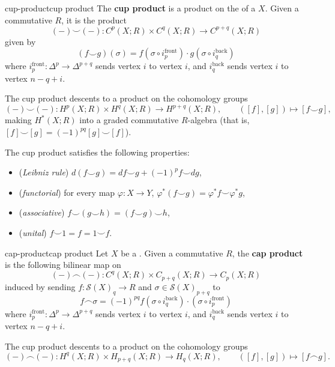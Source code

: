 \begin{topic}{cup-product}{cup product}
    The \textbf{cup product} is a product on the  of a  $X$. Given a commutative  $R$, it is the product
    \[ (-) \smile (-) : C^p(X; R) \times C^q(X; R) \to C^{p + q}(X; R) \]
    given by
    \[ (f \smile g)(\sigma) = f(\sigma \circ i_p^\text{front}) \cdot g(\sigma \circ i_q^\text{back}) \]
    where $i_p^\text{front} : \Delta^{p} \to \Delta^{p + q}$ sends vertex $i$ to vertex $i$, and $i_q^\text{back}$ sends vertex $i$ to vertex $n - q + i$.
    
    The cup product descents to a product on the cohomology groups
    \[ (-) \smile (-) : H^p(X; R) \times H^q(X; R) \to H^{p + q}(X; R), \qquad ([f], [g]) \mapsto [f \smile g] , \]
    making $H^*(X; R)$ into a graded commutative $R$-algebra (that is, $[f] \smile [g] = (-1)^{pq} [g] \smile [f]$).
    
    The cup product satisfies the following properties:
    \begin{itemize}
        \item (\textit{Leibniz rule}) $d(f \smile g) = df \smile g + (-1)^p f \smile dg$,
        \item (\textit{functorial}) for every map $\varphi : X \to Y$, $\varphi^*(f \smile g) = \varphi^* f \smile \varphi^* g$,
        \item (\textit{associative}) $f \smile (g \smile h) = (f \smile g) \smile h$,
        \item (\textit{unital}) $f \smile 1 = f = 1 \smile f$.
    \end{itemize}
\end{topic}

\begin{topic}{cap-product}{cap product}
    Let $X$ be a . Given a commutative  $R$, the \textbf{cap product} is the following bilinear map on 
    \[ (-) \frown (-) : C^q(X; R) \times C_{p + q}(X; R) \to C_p(X; R) \]
    induced by sending $f : \mathcal{S}(X)_q \to R$ and $\sigma \in \mathcal{S}(X)_{p + q}$ to
    \[ f \frown \sigma = (-1)^{pq} f(\sigma \circ i_q^\text{back}) \cdot (\sigma \circ i_p^\text{front})  \]
    where $i_p^\text{front} : \Delta^{p} \to \Delta^{p + q}$ sends vertex $i$ to vertex $i$, and $i_q^\text{back}$ sends vertex $i$ to vertex $n - q + i$.
    
    The cup product descents to a product on the cohomology groups
    \[ (-) \frown (-) : H^q(X; R) \times H_{p + q}(X; R) \to H_q(X; R), \qquad ([f], [g]) \mapsto [f \frown g] . \]
\end{topic}

